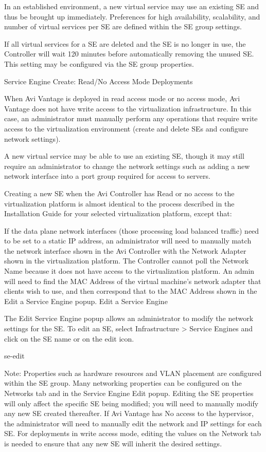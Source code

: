 \documentclass[letterpaper,10pt,english]{sphinxmanual}
\begin{document}
In an established environment, a new virtual service may use an existing SE and thus be brought up immediately. Preferences for high availability, scalability, and number of virtual services per SE are defined within the SE group settings.

If all virtual services for a SE are deleted and the SE is no longer in use, the Controller will wait 120 minutes before automatically removing the unused SE. This setting may be configured via the SE group properties.

Service Engine Create: Read/No Access Mode Deployments

When Avi Vantage is deployed in read access mode or no access mode, Avi Vantage does not have write access to the virtualization infrastructure. In this case, an administrator must manually perform any operations that require write access to the virtualization environment (create and delete SEs and configure network settings).

A new virtual service may be able to use an existing SE, though it may still require an administrator to change the network settings such as adding a new network interface into a port group required for access to servers.

Creating a new SE when the Avi Controller has Read or no access to the virtualization platform is almost identical to the process described in the Installation Guide for your selected virtualization platform, except that:

If the data plane network interfaces (those processing load balanced traffic) need to be set to a static IP address, an administrator will need to manually match the network interface shown in the Avi Controller with the Network Adapter shown in the virtualization platform. The Controller cannot poll the Network Name because it does not have access to the virtualization platform.
An admin will need to find the MAC Address of the virtual machine's network adapter that clients wish to use, and then correspond that to the MAC Address shown in the Edit a Service Engine popup.
Edit a Service Engine

The Edit Service Engine popup allows an administrator to modify the network settings for the SE. To edit an SE, select Infrastructure \textgreater{} Service Engines and click on the SE name or on the edit icon.

se-edit

Note: Properties such as hardware resources and VLAN placement are configured within the SE group.
Many networking properties can be configured on the Networks tab and in the Service Engine Edit popup. Editing the SE properties will only affect the specific SE being modified; you will need to manually modify any new SE created thereafter. If Avi Vantage has No access to the hypervisor, the administrator will need to manually edit the network and IP settings for each SE. For deployments in write access mode, editing the values on the Network tab is needed to ensure that any new SE will inherit the desired settings.
\end{document}
